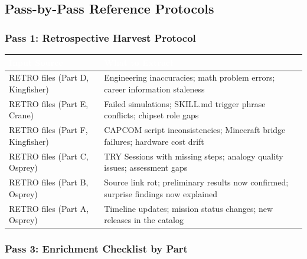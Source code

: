 \documentclass[11pt,letterpaper]{article}
\newcommand{\tableheader}[1]{\textbf{\sffamily\textcolor{white}{#1}}}
\begin{document}
\subsection{Pass-by-Pass Reference Protocols}

\subsubsection{Pass 1: Retrospective Harvest Protocol}

\begin{center}
\begin{tabularx}{\textwidth}{L{3.5cm}X}
\toprule
{}
\tableheader{Input Source} & \tableheader{What to Extract} \\
\midrule
RETRO files (Part D, Kingfisher) & Engineering inaccuracies; math problem errors; career information staleness \\
RETRO files (Part E, Crane) & Failed simulations; SKILL.md trigger phrase conflicts; chipset role gaps \\
RETRO files (Part F, Kingfisher) & CAPCOM script inconsistencies; Minecraft bridge failures; hardware cost drift \\
RETRO files (Part C, Osprey) & TRY Sessions with missing steps; analogy quality issues; assessment gaps \\
RETRO files (Part B, Osprey) & Source link rot; preliminary results now confirmed; surprise findings now explained \\
RETRO files (Part A, Osprey) & Timeline updates; mission status changes; new releases in the catalog \\
\bottomrule
\end{tabularx}
\end{center}

\subsubsection{Pass 3: Enrichment Checklist by Part}
\end{document}
